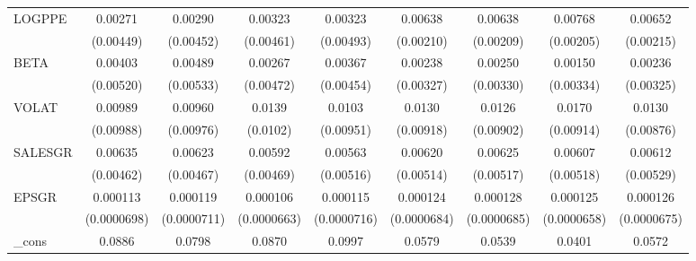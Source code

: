 \begin{table}[htbp]
\begin{tabular}{l*{8}{c}}
LOGPPE              &     0.00271         &     0.00290         &     0.00323         &     0.00323         &     0.00638\sym{***}&     0.00638\sym{***}&     0.00768\sym{***}&     0.00652\sym{***}\\
                    &   (0.00449)         &   (0.00452)         &   (0.00461)         &   (0.00493)         &   (0.00210)         &   (0.00209)         &   (0.00205)         &   (0.00215)         \\
BETA                &     0.00403         &     0.00489         &     0.00267         &     0.00367         &     0.00238         &     0.00250         &     0.00150         &     0.00236         \\
                    &   (0.00520)         &   (0.00533)         &   (0.00472)         &   (0.00454)         &   (0.00327)         &   (0.00330)         &   (0.00334)         &   (0.00325)         \\
VOLAT               &     0.00989         &     0.00960         &      0.0139         &      0.0103         &      0.0130         &      0.0126         &      0.0170\sym{*}  &      0.0130         \\
                    &   (0.00988)         &   (0.00976)         &    (0.0102)         &   (0.00951)         &   (0.00918)         &   (0.00902)         &   (0.00914)         &   (0.00876)         \\
SALESGR             &     0.00635         &     0.00623         &     0.00592         &     0.00563         &     0.00620         &     0.00625         &     0.00607         &     0.00612         \\
                    &   (0.00462)         &   (0.00467)         &   (0.00469)         &   (0.00516)         &   (0.00514)         &   (0.00517)         &   (0.00518)         &   (0.00529)         \\
EPSGR               &    0.000113         &    0.000119\sym{*}  &    0.000106         &    0.000115         &    0.000124\sym{*}  &    0.000128\sym{*}  &    0.000125\sym{*}  &    0.000126\sym{*}  \\
                    & (0.0000698)         & (0.0000711)         & (0.0000663)         & (0.0000716)         & (0.0000684)         & (0.0000685)         & (0.0000658)         & (0.0000675)         \\
\_cons              &      0.0886         &      0.0798         &      0.0870\sym{*}  &      0.0997\sym{*}  &      0.0579\sym{*}  &      0.0539         &      0.0401         &      0.0572\sym{*}  \\

\end{tabular}
\end{table}
